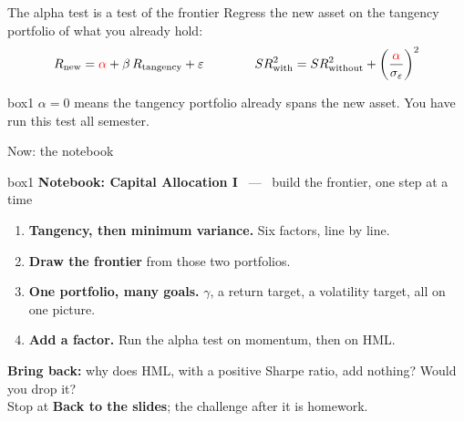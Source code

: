 \documentclass[aspectratio=169,10pt]{beamer}
\begin{document}
\begin{frame}[label=span]{The alpha test is a test of the frontier}
Regress the new asset on the tangency portfolio of what you already hold:
\[ R_{\text{new}} = \textcolor{red}{\alpha} + \beta\, R_{\text{tangency}} + \varepsilon
\qquad\qquad SR^{2}_{\text{with}} = SR^{2}_{\text{without}} + \left(\frac{\textcolor{red}{\alpha}}{\sigma_{\varepsilon}}\right)^{2} \]
\vskip 2pt
\begin{center}
\renewcommand{\arraystretch}{1.1}
\end{center}
\vskip 4pt
\begin{beamercolorbox}[rounded=true,sep=6pt,center]{box1}
$\alpha = 0$ means the tangency portfolio already spans the new asset. You have run this test all semester.
\end{beamercolorbox}
\hfill \hyperlink{appendix_span}{}
\end{frame}

\begin{frame}{Now: the notebook}
\vskip 2pt
\begin{beamercolorbox}[rounded=true,sep=7pt,center]{box1}
\textbf{Notebook: Capital Allocation I} \ --- \ build the frontier, one step at a time
\end{beamercolorbox}
\vskip 10pt
\begin{enumerate}
\item \textbf{Tangency, then minimum variance.} Six factors, line by line.
\vskip 4pt
\item \textbf{Draw the frontier} from those two portfolios.
\vskip 4pt
\item \textbf{One portfolio, many goals.} $\gamma$, a return target, a volatility target, all on one picture.
\vskip 4pt
\item \textbf{Add a factor.} Run the alpha test on momentum, then on HML.
\end{enumerate}
\vskip 8pt
{\small \textbf{Bring back:} why does HML, with a positive Sharpe ratio, add nothing? Would you drop it? \\[2pt]
Stop at \textbf{Back to the slides}; the challenge after it is homework.}
\end{frame}
\end{document}
